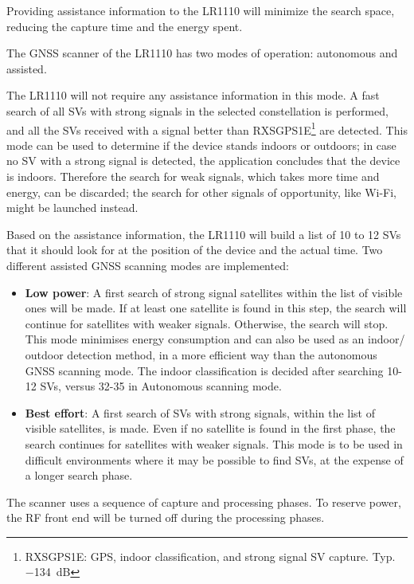 Providing assistance information to the LR1110 will minimize the search space, reducing the capture time and the energy spent.

The \ac{GNSS} scanner of the LR1110 has two modes of operation: autonomous and assisted.

The LR1110 will not require any assistance information in this mode. A fast search of all \ac{SV}s with strong signals in the
selected constellation is performed, and all the \ac{SV}s received with a signal better than RXSGPS1E\footnote{RXSGPS1E: GPS, indoor classification, and strong signal SV capture. Typ. \SI{-134}{\dB}\cite{LR1110_datasheet}} are detected.
This mode can be used to determine if the device stands indoors or outdoors; in case no \ac{SV} with a strong signal is detected, the application concludes that the device is indoors. Therefore the search for weak signals, which takes more time and energy, can be discarded; the search for other signals of opportunity, like Wi-Fi, might be launched instead.

Based on the assistance information, the LR1110 will build a list of 10 to 12 \ac{SV}s that it should look for at the position of the device and the actual time.
Two different assisted \ac{GNSS} scanning modes are implemented:
\begin{itemize}
\item \textbf{Low power}: A first search of strong signal satellites within the list of visible ones will be made. If at least one satellite is found in this step, the search will continue for satellites with weaker signals. Otherwise, the search will stop. This mode minimises energy consumption and can also be used as an indoor/ outdoor detection method, in a more efficient way than the autonomous \ac{GNSS} scanning mode. The indoor classification is decided after searching 10-12 \ac{SV}s, versus 32-35 in Autonomous scanning mode.
\item \textbf{Best effort}: A first search of \ac{SV}s with strong signals, within the list of visible satellites, is made. Even if no satellite is found in the first phase, the search continues for satellites with weaker signals. This mode is to be used in difficult environments where it may be possible to find \ac{SV}s, at the expense of a longer search phase.
\end{itemize}
The scanner uses a sequence of capture and processing phases. To reserve power, the \ac{RF} front end will be turned off during the processing phases.

